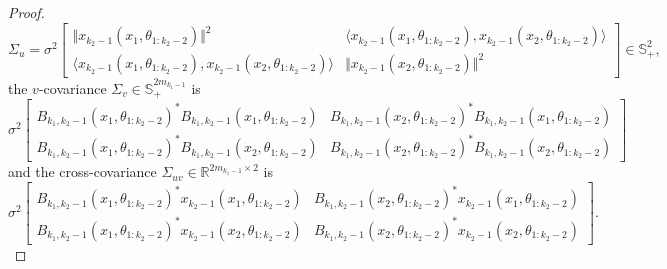 \documentclass[twoside,11pt]{article}
\newcommand{\R}{\mathbb{R}}
\begin{document}
\begin{proof}
\begin{equation}\label{eq:mean-Y-sigma-u}
\Sigma_u = \sigma^2 \left[ \begin{smallmatrix} \Vert x_{k_2-1}(x_1, \theta_{1 : k_2-2}) \Vert^2 & \langle x_{k_2-1}(x_1, \theta_{1 : k_2-2}), x_{k_2-1}(x_2, \theta_{1 : k_2-2}) \rangle \\ \langle x_{k_2-1}(x_1, \theta_{1 : k_2-2}), x_{k_2-1}(x_2, \theta_{1 : k_2-2}) \rangle & \Vert x_{k_2-1}(x_2, \theta_{1 : k_2-2}) \Vert^2 \end{smallmatrix} \right] \in \mathbb{S}^2_+,
\end{equation}
the $v$-covariance $\Sigma_v \in \mathbb{S}^{2m_{k_1-1}}_+$ is
\begin{equation}\label{eq:mean-Y-sigma-v}
\sigma^2 \left[ \begin{smallmatrix} B_{k_1,k_2-1}(x_1,\theta_{1:k_2-2})^* B_{k_1,k_2-1}(x_1,\theta_{1:k_2-2}) & B_{k_1,k_2-1}(x_2,\theta_{1:k_2-2})^* B_{k_1,k_2-1}(x_1,\theta_{1:k_2-2}) \\ B_{k_1,k_2-1}(x_1,\theta_{1:k_2-2})^* B_{k_1,k_2-1}(x_2,\theta_{1:k_2-2}) & B_{k_1,k_2-1}(x_2,\theta_{1:k_2-2})^* B_{k_1,k_2-1}(x_2,\theta_{1:k_2-2}) \end{smallmatrix} \right]
\end{equation}
and the cross-covariance $\Sigma_{uv} \in \R^{2m_{k_1-1} \times 2 }$ is
\begin{equation}\label{eq:mean-Y-sigma-uv}
\sigma^2 \left[ \begin{smallmatrix} B_{k_1,k_2-1}(x_1,\theta_{1:k_2-2})^* x_{k_2-1}(x_1, \theta_{1 : k_2-2}) & B_{k_1,k_2-1}(x_2,\theta_{1:k_2-2})^* x_{k_2-1}(x_1, \theta_{1 : k_2-2}) \\ B_{k_1,k_2-1}(x_1,\theta_{1:k_2-2})^* x_{k_2-1}(x_2, \theta_{1 : k_2-2}) & B_{k_1,k_2-1}(x_2,\theta_{1:k_2-2})^* x_{k_2-1}(x_2, \theta_{1 : k_2-2}) \end{smallmatrix} \right].
\end{equation}


\end{proof}
\end{document}

